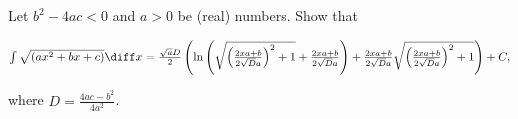 \label{problemIntegrate sqrt(ax^2+bx+c)dx}
Let $b^2-4ac<0$ and $a>0$ be (real) numbers. Show that 

\noindent $
\int \sqrt{\left(a x^2+b x+c\right)}\diff x = \frac{\sqrt{a}D}{2}\left( \ln \left(\sqrt{\left(\frac{2 x a+b}{2\sqrt{D}a}\right)^2 +1 }+\frac{2 x a+b}{2\sqrt{D}a}\right)+ \frac{2 x a+b}{2\sqrt{D}a} \sqrt{\left( \frac{2 x a+b}{2\sqrt{D}a} \right)^2+1}\right)+C,
$

where 
$\displaystyle D=\frac{4a c-b^2}{4a^2}$.




